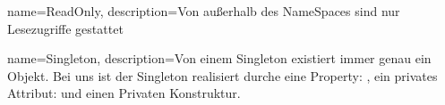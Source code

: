{
	name=ReadOnly,
	description={Von außerhalb des NameSpaces sind nur Lesezugriffe gestattet}
}

{
	name=Singleton,
	description={Von einem Singleton existiert immer genau ein Objekt. 
					Bei uns ist der Singleton realisiert durche eine Property: ,
					ein privates Attribut:  und einen Privaten Konstruktur.}
}
